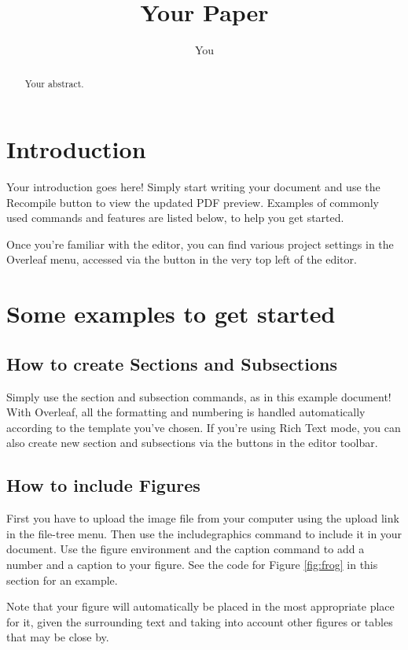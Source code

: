 \documentclass{article}
\title{Your Paper}
\author{You}
\begin{document}
\maketitle

\begin{abstract}
    Your abstract.
\end{abstract}

\section{Introduction}

Your introduction goes here! Simply start writing your document and use the Recompile button to view the updated PDF preview. Examples of commonly used commands and features are listed below, to help you get started.

Once you're familiar with the editor, you can find various project settings in the Overleaf menu, accessed via the button in the very top left of the editor.

\section{Some examples to get started}

\subsection{How to create Sections and Subsections}

Simply use the section and subsection commands, as in this example document! With Overleaf, all the formatting and numbering is handled automatically according to the template you've chosen. If you're using Rich Text mode, you can also create new section and subsections via the buttons in the editor toolbar.

\subsection{How to include Figures}

First you have to upload the image file from your computer using the upload link in the file-tree menu. Then use the includegraphics command to include it in your document. Use the figure environment and the caption command to add a number and a caption to your figure. See the code for Figure \ref{fig:frog} in this section for an example.

Note that your figure will automatically be placed in the most appropriate place for it, given the surrounding text and taking into account other figures or tables that may be close by.
\end{document}
